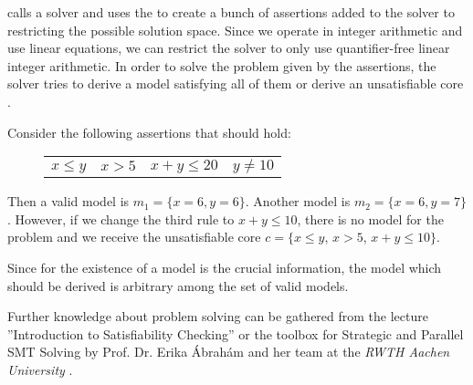 \aprove calls a solver and uses the \smtfactory to create a bunch of assertions added to the solver to restricting the possible solution space. Since we operate in integer arithmetic and use linear equations, we can restrict the solver to only use quantifier-free linear integer arithmetic. In order to solve the problem given by the assertions, the solver tries to derive a model satisfying all of them or derive an unsatisfiable core \cite{sat2016}\newline.

\begin{example}
	Consider the following assertions that should hold:\newline
	\vspace{-1em}
	\begin{figure}[H]
		\centering
		\begin{tabular}{cccc}
			$x \le y$ &	$x > 5 $ &	$ x+ y \le 20$ &$y \neq 10$ \\
		\end{tabular}
	\end{figure}
	\vspace{-1em}
	Then a valid model is $m_1 = \{x=6, y=6\}$. Another model is $m_2 = \{x=6, y=7\}$.
	However, if we change the third rule to $x+y\le 10$, there is no model for the problem and we receive the unsatisfiable core $c= \{x \le y$, $x > 5$, $x+ y \le 10 \}$.
\end{example}

Since for  the existence of a model is the crucial information, the model which should be derived is arbitrary among the set of valid models.

Further knowledge about  problem solving can be gathered from the lecture ''Introduction to Satisfiability Checking'' or the  toolbox for Strategic and Parallel SMT Solving by Prof. Dr. Erika Ábrahám and her team at the \textit{RWTH Aachen University} \cite{corzilius2015smt}.
